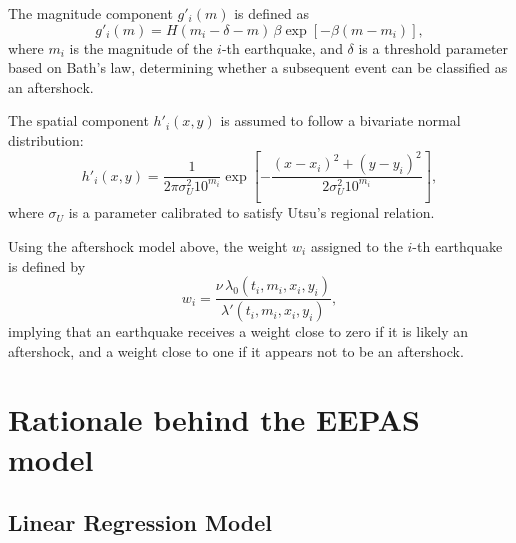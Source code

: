 \documentclass[extra,mreferee]{gji}
\theoremstyle{lemma}
\begin{document}
The magnitude component $g'_i(m)$ is defined as
\begin{equation}\label{g2im}
    g'_i(m) = H(m_i - \delta - m)\, \beta \exp\left[ -\beta (m - m_i) \right],
\end{equation}
where $m_i$ is the magnitude of the $i$-th earthquake, and $\delta$ is a threshold parameter based on Bath’s law, determining whether a subsequent event can be classified as an aftershock.  

The spatial component $h'_i(x,y)$ is assumed to follow a bivariate normal distribution:
\begin{equation}\label{h2ixy}
    h'_i(x,y) = \frac{1}{2\pi \sigma_U^2 10^{m_i}} \exp\left[ -\frac{(x - x_i)^2 + (y - y_i)^2}{2 \sigma_U^2 10^{m_i}} \right],
\end{equation}
where $\sigma_U$ is a parameter calibrated to satisfy Utsu’s regional relation.

Using the aftershock model above, the weight $w_i$ assigned to the $i$-th earthquake is defined by
\begin{equation}\label{wi}
    w_i = \frac{\nu\, \lambda_0(t_i, m_i, x_i, y_i)}{\lambda'(t_i, m_i, x_i, y_i)},
\end{equation}
implying that an earthquake receives a weight close to zero if it is likely an aftershock, and a weight close to one if it appears not to be an aftershock.

\section{Rationale behind the EEPAS model} \label{sec:derive_eepas_model}

\subsection{Linear Regression Model}
\end{document}
